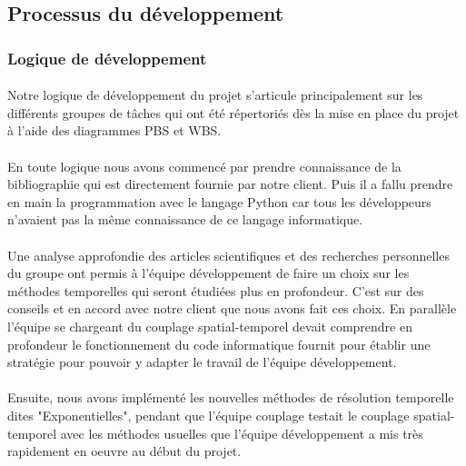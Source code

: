 \subsection{Processus du développement}

    \subsubsection{Logique de développement}
        \paragraph{}
        Notre logique de développement du projet s'articule principalement sur les différents groupes de tâches qui ont été répertoriés dès la mise en place du projet à l'aide des diagrammes PBS et WBS.

        \paragraph{}
        En toute logique nous avons commencé par prendre connaissance de la bibliographie qui est directement fournie par notre client. Puis il a fallu prendre en main la programmation avec le langage Python car tous les développeurs n'avaient pas la même connaissance de ce langage informatique.

        \paragraph{}
        Une analyse approfondie des articles scientifiques et des recherches personnelles du groupe ont permis à l'équipe développement de faire un choix sur les méthodes temporelles qui seront étudiées plus en profondeur. C'est sur des conseils et en accord avec notre client que nous avons fait ces choix. En parallèle l'équipe se chargeant du couplage spatial-temporel devait comprendre en profondeur le fonctionnement du code informatique fournit pour établir une stratégie pour pouvoir y adapter le travail de l'équipe développement.

        \paragraph{}
        Ensuite, nous avons implémenté les nouvelles méthodes de résolution temporelle dites "Exponentielles", pendant que l'équipe couplage testait le couplage spatial-temporel avec les méthodes usuelles que l'équipe développement a mis très rapidement en oeuvre au début du projet.

